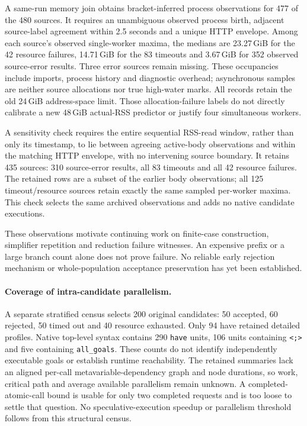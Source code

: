 \documentclass[10pt,twocolumn]{article}
\begin{document}
A same-run memory join obtains bracket-inferred process observations for
477 of the 480 sources. It requires an unambiguous observed process birth,
adjacent source-label agreement within 2.5 seconds and a unique HTTP envelope.
Among each source's observed single-worker maxima, the medians are
23.27\,GiB for the 42 resource failures, 14.71\,GiB for the 83 timeouts and
3.67\,GiB for 352 observed source-error results. Three error sources remain
missing. These occupancies include imports, process history and diagnostic
overhead; asynchronous samples are neither source allocations nor true
high-water marks. All records retain the old 24\,GiB address-space limit.
Those allocation-failure labels do not directly calibrate a new 48\,GiB
actual-RSS predictor or justify four simultaneous workers.

A sensitivity check requires the entire sequential RSS-read window, rather
than only its timestamp, to lie between agreeing active-body observations and
within the matching HTTP envelope, with no intervening source boundary.
It retains 435 sources: 310 source-error results, all 83 timeouts and all 42 resource
failures. The retained rows are a subset of the earlier body observations;
all 125 timeout/resource sources retain exactly the same sampled per-worker
maxima. This check selects the same archived observations and adds no native
candidate executions.

These observations motivate continuing work on finite-case construction,
simplifier repetition and reduction failure witnesses. An expensive prefix
or a large branch count alone does not prove failure. No reliable early
rejection mechanism or whole-population acceptance preservation has yet
been established.

\paragraph{Coverage of intra-candidate parallelism.}
A separate stratified census selects 200 original candidates: 50 accepted,
60 rejected, 50 timed out and 40 resource exhausted. Only 94 have retained
detailed profiles. Native top-level syntax contains 290 \texttt{have} units,
106 units containing \texttt{<;>} and five containing \texttt{all\_goals}.
These counts do not identify independently executable goals or establish
runtime reachability. The retained summaries lack an aligned per-call
metavariable-dependency graph and node durations, so work, critical path and
average available parallelism remain unknown. A completed-atomic-call bound
is usable for only two completed requests and is too loose to settle that
question. No speculative-execution speedup or parallelism threshold follows
from this structural census.
\end{document}

